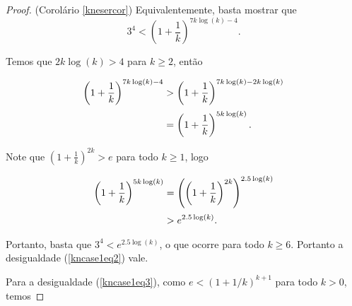 \begin{proof}{(Corolário \ref{knesercor})}
Equivalentemente, basta mostrar que \[3^4 < \left(1+\frac{1}{k}\right)^{7k\log(k)-4}.\]



Temos que $2k\log(k) > 4$ para $k\geq 2$, então 

\begin{equation*}
\setlength{\jot}{5pt}
\begin{aligned}
\left(1+\frac{1}{k}\right)^{7k\log(k)-4} &> \left(1+\frac{1}{k}\right)^{7k\log(k)-2k\log(k)}\\
&= \left(1+\frac{1}{k}\right)^{5k\log(k)}.
\end{aligned}
\end{equation*}

Note que $(1+\frac{1}{k})^{2k} > e$ para todo $k\geq 1$, logo

\begin{equation*}
\setlength{\jot}{5pt}
\begin{aligned}
\left(1+\frac{1}{k}\right)^{5k\log(k)} &= \left(\left(1+\frac{1}{k}\right)^{2k}\right)^{2.5\log(k)}\\
&> e^{2.5\log(k)}.
\end{aligned}
\end{equation*}

Portanto, basta que $3^4 < e^{2.5\log(k)}$, o que ocorre para todo $k\geq 6$. Portanto a desigualdade (\ref{kncase1eq2}) vale.


\vspace{1em}Para a desigualdade (\ref{kncase1eq3}), como $e < (1+1/k)^{k+1}$ para todo $k>0$, temos


\end{proof}

